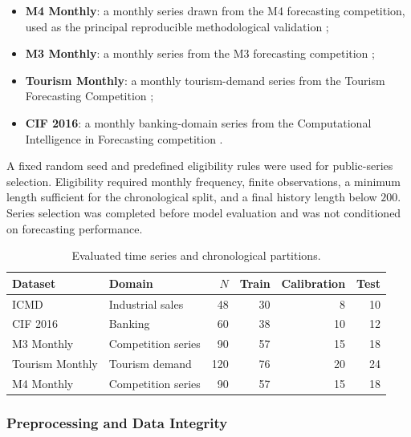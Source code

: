 \documentclass[review,number,sort&compress]{elsarticle}
\begin{document}
\begin{itemize}
    \item \textbf{M4 Monthly}: a monthly series drawn from the M4 forecasting
    competition, used as the principal reproducible methodological validation
    \citep{makridakis2020m4};

    \item \textbf{M3 Monthly}: a monthly series from the M3 forecasting
    competition \citep{makridakis2000m3};

    \item \textbf{Tourism Monthly}: a monthly tourism-demand series from the
    Tourism Forecasting Competition \citep{athanasopoulos2011tourism};

    \item \textbf{CIF 2016}: a monthly banking-domain series from the
    Computational Intelligence in Forecasting competition
    \citep{stepnicka2017cif}.
\end{itemize}

A fixed random seed and predefined eligibility rules were used for public-series
selection. Eligibility required monthly frequency, finite observations, a
minimum length sufficient for the chronological split, and a final history
length below $200$. Series selection was completed before model evaluation and
was not conditioned on forecasting performance.

\begin{table}[t]
\centering
\caption{Evaluated time series and chronological partitions.}
\label{tab:datasets}
\small
\setlength{\tabcolsep}{5pt}
\begin{tabular}{llrrrr}
\toprule
Dataset &
Domain &
$N$ &
Train &
Calibration &
Test \\
\midrule
ICMD
& Industrial sales
& 48
& 30
& 8
& 10 \\
CIF 2016
& Banking
& 60
& 38
& 10
& 12 \\
M3 Monthly
& Competition series
& 90
& 57
& 15
& 18 \\
Tourism Monthly
& Tourism demand
& 120
& 76
& 20
& 24 \\
M4 Monthly
& Competition series
& 90
& 57
& 15
& 18 \\
\bottomrule
\end{tabular}
\end{table}

\subsubsection{Preprocessing and Data Integrity}
\end{document}
